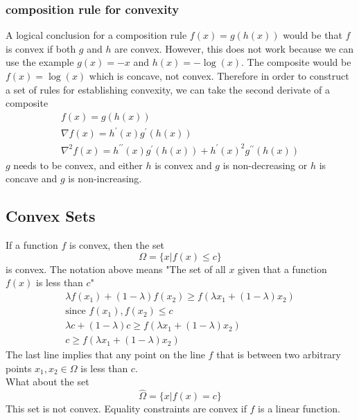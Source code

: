 \subsubsection{composition rule for convexity}
A logical conclusion for a composition rule $f(x) = g(h(x))$ would be that $f$ is convex if both $g$ and $h$ are convex. However, this does not work because we can use the example $g(x) = -x$ and $h(x) = -\log(x)$. The composite would be $f(x) = \log(x)$ which is concave, not convex. Therefore in order to construct a set of rules for establishing convexity, we can take the second derivate of a composite
\begin{gather}
  f(x) = g(h(x)) \\ 
  \nabla f(x) = h^\prime(x) g^\prime(h(x)) \\
  \nabla^2 f(x) = h^{\prime \prime}(x) g^\prime(h(x)) + h^\prime(x)^2 g^{\prime \prime}(h(x))
\end{gather}
$g$ needs to be convex, and either $h$ is convex and $g$ is non-decreasing or $h$ is concave and $g$ is non-increasing.

\subsection{Convex Sets}
If a function $f$ is convex, then the set
\begin{equation}
  \Omega = \{ x | f(x) \leq c \}
\end{equation}
is convex. The notation above means "The set of all $x$ given that a function $f(x)$ is less than $c$"
\begin{gather}
  \lambda f(x_1) + (1-\lambda) f(x_2) \geq f(\lambda x_1 + (1-\lambda)x_2) \\
  \text{since } f(x_1), f(x_2) \leq c \\
  \lambda c + (1-\lambda) c \geq f(\lambda x_1 + (1-\lambda)x_2) \\ 
  c \geq f(\lambda x_1 + (1-\lambda)x_2)
\end{gather}
The last line implies that any point on the line $f$ that is between two arbitrary points $x_1,x_2 \in \Omega$ is less than $c$. \\
What about the set 
\begin{equation}
  \hat{\Omega} = \{x | f(x) = c\} 
\end{equation}
This set is not convex. Equality constraints are convex if $f$ is a linear function.